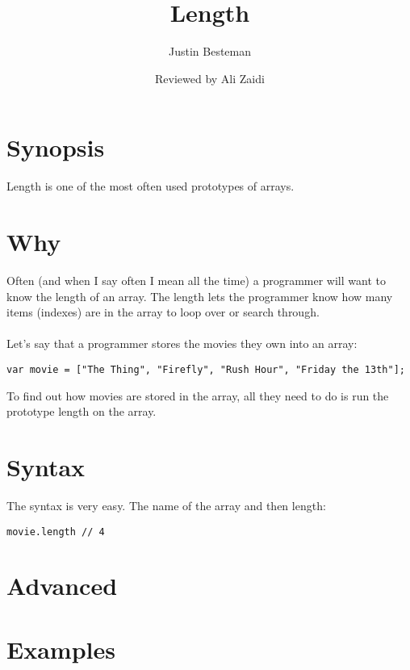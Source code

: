 \documentclass[12pt, letterpaper]{article}
\title{Length}
\author{Justin Besteman}
\date{Reviewed by Ali Zaidi}
\begin{document}
\maketitle


\section*{Synopsis}

Length is one of the most often used prototypes of arrays. 

\section*{Why}

Often (and when I say often I mean all the time) a programmer will want to know the length of an array. The length lets the programmer know how many items (indexes) are in the array to loop over or search through. \\ \\
Let's say that a programmer stores the movies they own into an array:
\begin{lstlisting}
var movie = ["The Thing", "Firefly", "Rush Hour", "Friday the 13th"];
\end{lstlisting}
To find out how movies are stored in the array, all they need to do is run the prototype length on the array.
\section*{Syntax}
The syntax is very easy. The name of the array and then length:
\begin{lstlisting}
movie.length // 4
\end{lstlisting}
\section*{Advanced}

\section*{Examples}
\end{document}
